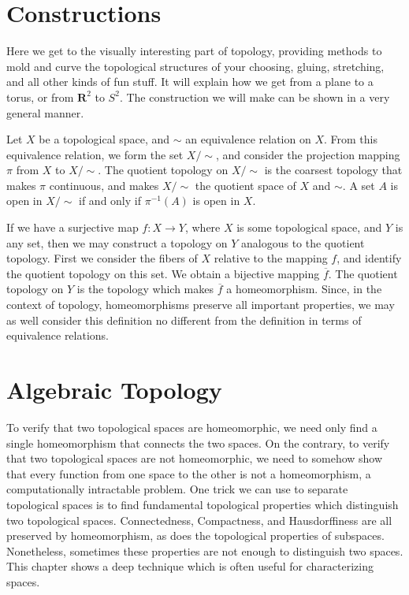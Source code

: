 \chapter{Constructions}

Here we get to the visually interesting part of topology, providing methods to mold and curve the topological structures of your choosing, gluing, stretching, and all other kinds of fun stuff. It will explain how we get from a plane to a torus, or from $\mathbf{R}^2$ to $S^2$. The construction we will make can be shown in a very general manner.

\begin{definition}
    Let $X$ be a topological space, and $\sim$ an equivalence relation on $X$. From this equivalence relation, we form the set $X/\sim$, and consider the projection mapping $\pi$ from $X$ to $X/\sim$. The quotient topology on $X/\sim$ is the coarsest topology that makes $\pi$ continuous, and makes $X/\sim$ the quotient space of $X$ and $\sim$. A set $A$ is open in $X/\sim$ if and only if $\pi^{-1}(A)$ is open in $X$.
\end{definition}

If we have a surjective map $f:X \to Y$, where $X$ is some topological space, and $Y$ is any set, then we may construct a topology on $Y$ analogous to the quotient topology. First we consider the fibers of $X$ relative to the mapping $f$, and identify the quotient topology on this set. We obtain a bijective mapping $\overline{f}$. The quotient topology on $Y$ is the topology which makes $\overline{f}$ a homeomorphism. Since, in the context of topology, homeomorphisms preserve all important properties, we may as well consider this definition no different from the definition in terms of equivalence relations.

\chapter{Algebraic Topology}

To verify that two topological spaces are homeomorphic, we need only find a single homeomorphism that connects the two spaces. On the contrary, to verify that two topological spaces are not homeomorphic, we need to somehow show that every function from one space to the other is not a homeomorphism, a computationally intractable problem. One trick we can use to separate topological spaces is to find fundamental topological properties which distinguish two topological spaces. Connectedness, Compactness, and Hausdorffiness are all preserved by homeomorphism, as does the topological properties of subspaces. Nonetheless, sometimes these properties are not enough to distinguish two spaces. This chapter shows a deep technique which is often useful for characterizing spaces.

